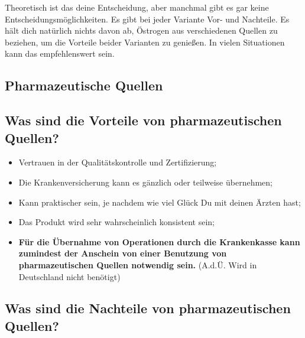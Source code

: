 \documentclass{article}
\begin{document}
{Theoretisch ist das deine Entscheidung, aber manchmal gibt es gar keine Entscheidungsmöglichkeiten. Es gibt bei jeder Variante Vor- und Nachteile. Es hält dich natürlich nichts davon ab, Östrogen aus verschiedenen Quellen zu beziehen, um die Vorteile beider Varianten zu genießen. In vielen Situationen kann das empfehlenswert sein.

\subsection*{Pharmazeutische Quellen}

\subsection{Was sind die Vorteile von pharmazeutischen Quellen?}

\begin{itemize}
  \item Vertrauen in der Qualitätskontrolle und Zertifizierung;
  \item Die Krankenversicherung kann es gänzlich oder teilweise übernehmen;
  \item Kann praktischer sein, je nachdem wie viel Glück Du mit deinen Ärzten hast;
  \item Das Produkt wird sehr wahrscheinlich konsistent sein;
  \item \textbf{Für die Übernahme von Operationen durch die Krankenkasse kann zumindest der Anschein von einer Benutzung von pharmazeutischen Quellen notwendig sein.} (A.d.Ü. Wird in Deutschland nicht benötigt)
\end{itemize}

\subsection{Was sind die Nachteile von pharmazeutischen Quellen?}

}
\end{document}
